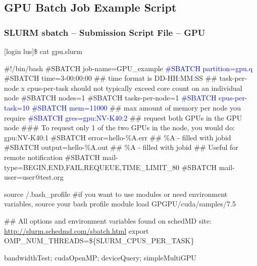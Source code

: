 \subsection{GPU Batch Job Example Script}
\begin{frame}[fragile]
\frametitle{SLURM sbatch -- Submission Script File -- GPU}
\begin{semiverbatim}\tiny
[login lus]\$ cat gpu.slurm

\#!/bin/bash
\#SBATCH \ddash{}job-name=GPU\_example
\textcolor{blue}{\#SBATCH \ddash{}partition=gpu.q}
\#SBATCH \ddash{}time=3-00:00:00 ## time format is DD-HH:MM:SS
\#\# task-per-node x cpus-per-task should not typically exceed core count on an individual node 
\#SBATCH \ddash{}nodes=1
\#SBATCH \ddash{}tasks-per-node=1
\textcolor{blue}{\#SBATCH \ddash{}cpus-per-task=10}
\textcolor{blue}{\#SBATCH \ddash{}mem=11000} \#\# max amount of memory per node you require
\textcolor{blue}{\#SBATCH \ddash{}gres=gpu:NV-K40:2 } \#\# request both GPUs in the GPU node
\#\#\# To request only 1 of the two GPUs in the node, you would do: gpu:NV-K40:1
\#SBATCH \ddash{}error=hello-\%A.err \#\# \%A - filled with jobid
\#SBATCH \ddash{}output=hello-\%A.out \#\# \%A - filled with jobid
\#\# Useful for remote notification
\#SBATCH \ddash{}mail-type=BEGIN,END,FAIL,REQUEUE,TIME\_LIMIT\_80
\#SBATCH \ddash{}mail-user=user@test.org

source \ctilde/.bash_profile \#if you want to use modules or need environment variables, source your bash profile
module load GPGPU/cuda/samples/7.5

\#\# All options and environment variables found on schedMD site: \href{http://slurm.schedmd.com/sbatch.html}{http://slurm.schedmd.com/sbatch.html}
export OMP\_NUM\_THREADS=\$\{SLURM\_CPUS\_PER\_TASK\}

bandwidthTest; cudaOpenMP; deviceQuery; simpleMultiGPU
\end{semiverbatim}
\end{frame}



